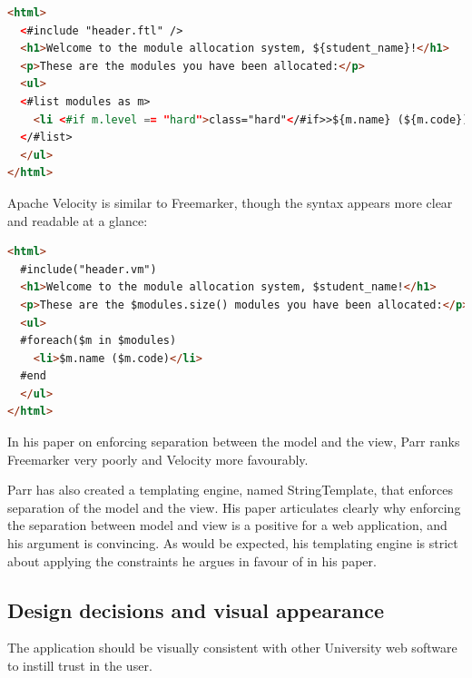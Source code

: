 \documentclass[]{scrartcl}
\begin{document}
\begin{lstlisting}[language=HTML]
<html>
  <#include "header.ftl" />
  <h1>Welcome to the module allocation system, ${student_name}!</h1>
  <p>These are the modules you have been allocated:</p>
  <ul>
  <#list modules as m>
    <li <#if m.level == "hard">class="hard"</#if>>${m.name} (${m.code})</li>
  </#list>
  </ul>
</html>
\end{lstlisting}


Apache Velocity is similar to Freemarker, though the syntax appears more clear
and readable at a glance:

\begin{lstlisting}[language=HTML]
<html>
  #include("header.vm")
  <h1>Welcome to the module allocation system, $student_name!</h1>
  <p>These are the $modules.size() modules you have been allocated:</p>
  <ul>
  #foreach($m in $modules)
    <li>$m.name ($m.code)</li>
  #end
  </ul>
</html>
\end{lstlisting}

In his paper on enforcing separation between the model and the view, Parr
\cite{Parr2004templateengines} ranks Freemarker very poorly and Velocity more
favourably.


Parr has also created a templating engine, named StringTemplate, that enforces
separation of the model and the view. His paper articulates clearly why
enforcing the separation between model and view is a positive for a web
application, and his argument is convincing. As would be expected, his
templating engine is strict about applying the constraints he argues in favour
of in his paper.



\subsection{Design decisions and visual appearance}

The application should be visually consistent with other University web
software to instill trust in the user.
\end{document}
